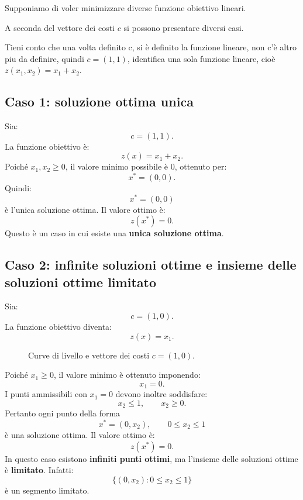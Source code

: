 Supponiamo di voler minimizzare diverse funzione obiettivo lineari.

A seconda del vettore dei costi $c$ si possono presentare diversi casi.
\begin{center}
    Tieni conto che una volta definito c, si è definito la funzione lineare, non c'è altro piu da definire,
    quindi $c = (1,1)$, identifica una sola funzione lineare, cioè $z(x_1,x_2) = x_1 + x_2$.
\end{center}
\subsection{Caso 1: soluzione ottima unica} Sia: \[ c=(1,1). \] La funzione obiettivo è: \[ z(x)=x_1+x_2. \] Poiché $x_1,x_2\geq0$, il valore minimo possibile è $0$, ottenuto per: \[ x^*=(0,0). \] Quindi: \[ \boxed{x^*=(0,0)} \] è l'unica soluzione ottima. Il valore ottimo è: \[ z(x^*)=0. \] Questo è un caso in cui esiste una \textbf{unica soluzione ottima}. 
\subsection{Caso 2: infinite soluzioni ottime e insieme delle soluzioni ottime limitato} Sia: \[ c=(1,0). \] La funzione obiettivo diventa: \[ z(x)=x_1. \] 
\begin{figure}[h]
\centering
{}
\caption{Curve di livello e vettore dei costi $c=(1,0)$.}
\end{figure}

Poiché $x_1\geq0$, il valore minimo è ottenuto imponendo: \[ x_1=0. \] I punti ammissibili con $x_1=0$ devono inoltre soddisfare: \[ x_2\leq1, \qquad x_2\geq0. \] Pertanto ogni punto della forma \[ \boxed{ x^*=(0,x_2),\qquad 0\leq x_2\leq1 } \] è una soluzione ottima. Il valore ottimo è: \[ z(x^*)=0. \] In questo caso esistono \textbf{infiniti punti ottimi}, ma l'insieme delle soluzioni ottime è \textbf{limitato}. Infatti: \[ \{(0,x_2):0\leq x_2\leq1\} \] è un segmento limitato. 
